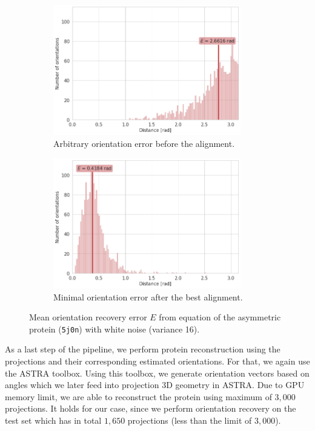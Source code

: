 \begin{figure}[ht!]
    \centering
    \begin{subfigure}[b]{0.45\textwidth}
        \includegraphics[height=5.7cm]{images/5j0n_noise16_angle_alignment_before.png}
        \caption{Arbitrary orientation error before the alignment.}
    \end{subfigure}
    \hfill
    \begin{subfigure}[b]{0.5\textwidth}
    \centering
        \includegraphics[height=5.7cm]{images/5j0n_noise16_angle_alignment_after.png}
        \caption{Minimal orientation error after the best alignment.}
    \end{subfigure}
    \caption{
        Mean orientation recovery error $E$ from equation  of the asymmetric protein (\texttt{5j0n}) with white noise (variance 16).
}
    \label{fig:angle-alignment-5j0n-noise16}
\end{figure}

As a last step of the pipeline, we perform protein reconstruction using the projections and their corresponding estimated orientations.
For that, we again use the ASTRA toolbox.
Using this toolbox, we generate orientation vectors based on angles which we later feed into projection 3D geometry in ASTRA.
Due to GPU memory limit, we are able to reconstruct the protein using maximum of $3,000$ projections.
It holds for our case, since we perform orientation recovery on the test set which has in total $1,650$ projections (less than the limit of $3,000$).

